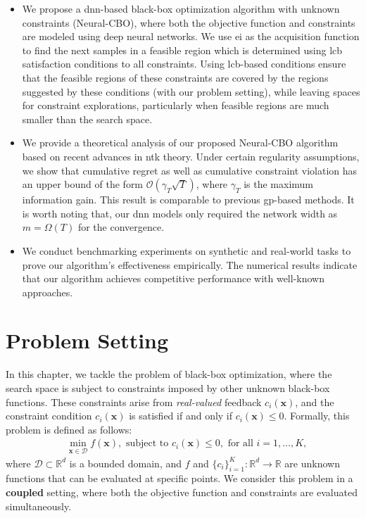 \begin{itemize}
    \item We propose a \ac{dnn}-based black-box optimization algorithm with unknown constraints (Neural-CBO), where both the objective function and constraints are modeled using deep neural networks. We use \ac{ei} as the acquisition function to find the next samples in a feasible region which is determined using \acf{lcb} satisfaction conditions to all constraints. Using \ac{lcb}-based conditions ensure that the feasible regions of these constraints are covered by the regions suggested by these conditions (with our problem setting), while leaving spaces for constraint explorations, particularly when feasible regions are much smaller than the search space.
 

    \item We provide a theoretical analysis of our proposed Neural-CBO algorithm based on recent advances in \ac{ntk} theory. Under certain regularity assumptions, we show that cumulative regret as well as cumulative constraint violation has an upper bound of the form $\mathcal{O}(\gamma_T\sqrt{T})$, where $\gamma_T$ is the maximum information gain. This result is comparable to previous \ac{gp}-based methods. It is worth noting that, our \ac{dnn} models only required the network width as $m=\Omega(T)$  for the convergence. 
    \item We conduct benchmarking experiments on synthetic and real-world tasks to prove our algorithm's effectiveness empirically. The numerical results indicate that our algorithm achieves competitive performance with well-known approaches.
    \end{itemize}
\section{Problem Setting}
In this chapter, we tackle the problem of black-box optimization, where the search space is subject to constraints imposed by other unknown black-box functions. These constraints arise from \emph{real-valued} feedback $c_i(\mathbf{x})$, and the constraint condition $c_i(\mathbf{x})$ is satisfied if and only if $c_i(\mathbf{x}) \leq 0$.  
Formally, this problem is defined as follows:
\begin{equation*}
    \begin{split}
        & \underset{\mathbf{x} \in \mathcal{D}}{\min} f(\mathbf{x}),  \text{ subject to }  c_i (\mathbf{x})  \leq 0, \text{ for all } i = 1, \dots, K,
    \end{split}
\end{equation*}  
where $\mathcal{D} \subset \mathbb{R}^d$ is a bounded domain, and $f$ and $\{c_i\}_{i=1}^K \colon \mathbb{R}^d \rightarrow \mathbb{R}$ are unknown functions that can be evaluated at specific points. We consider this problem in a \textbf{coupled} setting, where both the objective function and constraints are evaluated simultaneously.


